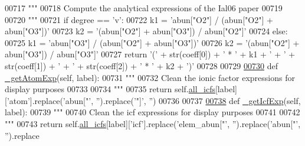 \begin{DoxyCode}
{{{00717         \textcolor{stringliteral}{"""}
00718 \textcolor{stringliteral}{        Compute the analytical expressions of the Ial06 paper}
00719 \textcolor{stringliteral}{        }
00720 \textcolor{stringliteral}{        """}
00721         \textcolor{keywordflow}{if} degree == \textcolor{stringliteral}{'v'}:
00722             k1 = \textcolor{stringliteral}{'abun["O2"] / (abun["O2"] + abun["O3"])'}
00723             k2 = \textcolor{stringliteral}{'(abun["O2"] + abun["O3"]) / abun["O2"]'}
00724         \textcolor{keywordflow}{else}:
00725             k1 = \textcolor{stringliteral}{'abun["O3"] / (abun["O2"] + abun["O3"])'}
00726             k2 = \textcolor{stringliteral}{'(abun["O2"] + abun["O3"]) / abun["O3"]'}
00727         \textcolor{keywordflow}{return} \textcolor{stringliteral}{'('} + str(coeff[0]) + \textcolor{stringliteral}{' * '} + k1 + \textcolor{stringliteral}{' + '} + str(coeff[1]) + \textcolor{stringliteral}{' + '} + str(coeff[2]) + \textcolor{stringliteral}{' * '} + 
      k2 + \textcolor{stringliteral}{')'}
00728 
00729 
\hypertarget{icf_8py_source_l00730}{}\hyperlink{classpyneb_1_1core_1_1icf_1_1_i_c_f_a6d82c58aa562e61e6074c6b8757583c4}{00730}     \textcolor{keyword}{def }\hyperlink{classpyneb_1_1core_1_1icf_1_1_i_c_f_a6d82c58aa562e61e6074c6b8757583c4}{\_getAtomExp}(self, label):
00731         \textcolor{stringliteral}{"""}
00732 \textcolor{stringliteral}{        Clean the ionic factor expressions for display purposes}
00733 \textcolor{stringliteral}{        }
00734 \textcolor{stringliteral}{        """}
00735         \textcolor{keywordflow}{return} self.\hyperlink{classpyneb_1_1core_1_1icf_1_1_i_c_f_a854ee87a53feb102e429e902227ce88b}{all\_icfs}[label][\textcolor{stringliteral}{'atom'}].replace(\textcolor{stringliteral}{'abun["'}, \textcolor{stringliteral}{''}).replace(\textcolor{stringliteral}{'"]'}, \textcolor{stringliteral}{''})
00736 
00737 
\hypertarget{icf_8py_source_l00738}{}\hyperlink{classpyneb_1_1core_1_1icf_1_1_i_c_f_aa0ed356c2833c48010dfc7aa71a07419}{00738}     \textcolor{keyword}{def }\hyperlink{classpyneb_1_1core_1_1icf_1_1_i_c_f_aa0ed356c2833c48010dfc7aa71a07419}{\_getIcfExp}(self, label):
00739         \textcolor{stringliteral}{"""}
00740 \textcolor{stringliteral}{        Clean the icf expressions for display purposes}
00741 \textcolor{stringliteral}{}
00742 \textcolor{stringliteral}{        """}        
00743         \textcolor{keywordflow}{return} self.\hyperlink{classpyneb_1_1core_1_1icf_1_1_i_c_f_a854ee87a53feb102e429e902227ce88b}{all\_icfs}[label][\textcolor{stringliteral}{'icf'}].replace(\textcolor{stringliteral}{'elem\_abun["'}, \textcolor{stringliteral}{''}).replace(\textcolor{stringliteral}{'abun["'}, \textcolor{stringliteral}{''}).replace
}}}
\end{DoxyCode}
